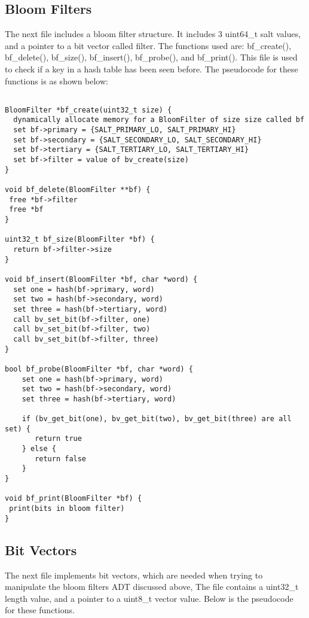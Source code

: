 \documentclass[11pt]{article}
\begin{document}
\subsection{Bloom Filters}
The next file includes a bloom filter structure. It includes 3 uint64\_t salt values, and a pointer to a bit vector called filter. The functions used are: bf\_create(), bf\_delete(), bf\_size(), bf\_insert(), bf\_probe(), and bf\_print(). This file is used to check if a key in a hash table has been seen before. The pseudocode for these functions is as shown below:
\begin{verbatim}

BloomFilter *bf_create(uint32_t size) {
  dynamically allocate memory for a BloomFilter of size size called bf
  set bf->primary = {SALT_PRIMARY_LO, SALT_PRIMARY_HI}
  set bf->secondary = {SALT_SECONDARY_LO, SALT_SECONDARY_HI}
  set bf->tertiary = {SALT_TERTIARY_LO, SALT_TERTIARY_HI}
  set bf->filter = value of bv_create(size)
}

void bf_delete(BloomFilter **bf) {
 free *bf->filter
 free *bf
}

uint32_t bf_size(BloomFilter *bf) {
  return bf->filter->size
}

void bf_insert(BloomFilter *bf, char *word) {
  set one = hash(bf->primary, word)
  set two = hash(bf->secondary, word)
  set three = hash(bf->tertiary, word)
  call bv_set_bit(bf->filter, one) 
  call bv_set_bit(bf->filter, two)
  call bv_set_bit(bf->filter, three)
}

bool bf_probe(BloomFilter *bf, char *word) {
    set one = hash(bf->primary, word)
    set two = hash(bf->secondary, word)
    set three = hash(bf->tertiary, word)
    
    if (bv_get_bit(one), bv_get_bit(two), bv_get_bit(three) are all set) {
       return true
    } else {
       return false
    }
}

void bf_print(BloomFilter *bf) {
 print(bits in bloom filter)
}

\end{verbatim}

\subsection{Bit Vectors}
The next file implements bit vectors, which are needed when trying to manipulate the bloom filters ADT discussed above, The file contains a uint32\_t length value, and a pointer to a uint8\_t vector value. Below is the pseudocode for these functions.
\end{document}
